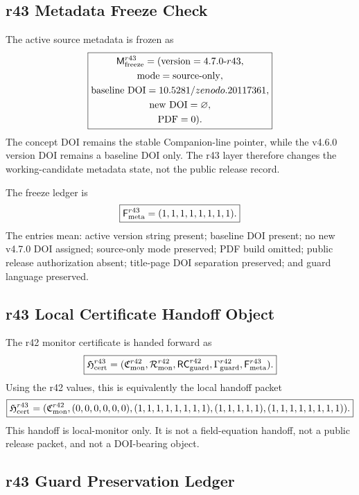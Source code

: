 \subsection{r43 Metadata Freeze Check}
\label{subsec:r43-metadata-freeze-check}

The active source metadata is frozen as
\[
\boxed{
\begin{gathered}
\mathsf M_{\rm freeze}^{r43}
=
(\mathrm{version}=4.7.0\hbox{-}r43,\\
\mathrm{mode}=\mathrm{source\mbox{-}only},\\
\mathrm{baseline\ DOI}=10.5281/zenodo.20117361,\\
\mathrm{new\ DOI}=\varnothing,\\
\mathrm{PDF}=0).
\end{gathered}
}
\]
The concept DOI remains the stable Companion-line pointer, while the v4.6.0
version DOI remains a baseline DOI only.  The r43 layer therefore changes the
working-candidate metadata state, not the public release record.

The freeze ledger is
\[
\boxed{
\mathsf F_{\rm meta}^{r43}
=(1,1,1,1,1,1,1,1).
}
\]
The entries mean: active version string present; baseline DOI present; no new
v4.7.0 DOI assigned; source-only mode preserved; PDF build omitted; public
release authorization absent; title-page DOI separation preserved; and guard
language preserved.

\subsection{r43 Local Certificate Handoff Object}
\label{subsec:r43-local-certificate-handoff}

The r42 monitor certificate is handed forward as
\[
\boxed{
\mathfrak H_{\rm cert}^{r43}
=
(\mathfrak C_{\rm mon}^{r42},
\mathcal R_{\rm mon}^{r42},
\mathsf{RC}_{\rm guard}^{r42},
\Gamma_{\rm guard}^{r42},
\mathsf F_{\rm meta}^{r43}).
}
\]
Using the r42 values, this is equivalently the local handoff packet
\[
\boxed{
\mathfrak H_{\rm cert}^{r43}
=
(\mathfrak C_{\rm mon}^{r42},
(0,0,0,0,0,0),
(1,1,1,1,1,1,1,1),
(1,1,1,1,1),
(1,1,1,1,1,1,1,1)).
}
\]
This handoff is local-monitor only.  It is not a field-equation handoff, not a
public release packet, and not a DOI-bearing object.

\subsection{r43 Guard Preservation Ledger}
\label{subsec:r43-guard-preservation-ledger}

